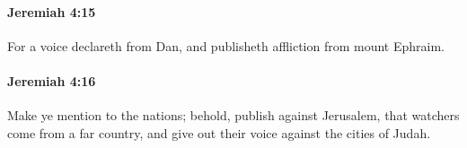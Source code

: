 		\paragraph{Jeremiah 4:15} %
			\label{JEREMIAH-4-15}

			For a voice declareth from Dan, and publisheth affliction from mount Ephraim.


		\paragraph{Jeremiah 4:16} %
			\label{JEREMIAH-4-16}

			Make ye mention to the nations; behold, publish against Jerusalem, that watchers come from a far country, and give out their voice against the cities of Judah.


